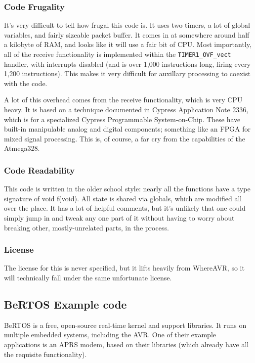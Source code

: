 \documentclass{article}
\begin{document}
\subsubsection{Code Frugality}

It's very difficult to tell how frugal this code is.  It uses two
timers, a lot of global variables, and fairly sizeable packet buffer.
It comes in at somewhere around half a kilobyte of RAM, and looks like
it will use a fair bit of CPU.  Most importantly, all of the receive
functionality is implemented within the \texttt{TIMER1_OVF_vect}
handler, with interrupts disabled (and is over 1,000 instructions
long, firing every 1,200 instructions).  This makes it very difficult
for auxillary processing to coexist with the code.

A lot of this overhead comes from the receive functionality, which is
very CPU heavy.  It is based on a technique documented in Cypress
Application Note 2336\cite{cypress2336},  which is for a specialized
Cypress Programmable System-on-Chip.  These have built-in manipulable
analog and digital components; something like an FPGA for mixed signal
processing.  This is, of course, a far cry from the capabilities of
the Atmega328.

\subsubsection{Code Readability}

This code is written in the older school style: nearly all the
functions have a type signature of void f(void).  All state is shared
via globals, which are modified all over the place.  It has a lot of
helpful comments, but it's unlikely that one could simply jump in and
tweak any one part of it without having to worry about breaking other,
mostly-unrelated parts, in the process.


\subsubsection{License}

The license for this is never specified, but it lifts heavily from
WhereAVR, so it will technically fall under the same unfortunate
license.

\subsection{BeRTOS Example code}

BeRTOS\cite{BeRTOS} is a free, open-source real-time kernel and
support libraries.  It runs on multiple embedded systems, including
the AVR.  One of their example applications\cite{BeRTOSAPRS} is an APRS modem, based on
their libraries (which already have all the requisite functionality).
\end{document}
